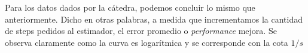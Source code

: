 \documentclass[10pt, a4paper,english,spanish,hidelinks]{article}
\begin{document}
Para los datos dados por la cátedra, podemos concluir lo mismo que anteriormente. Dicho en otras palabras, a medida que incrementamos la cantidad de steps pedidos al estimador, el error promedio o \textit{performance} mejora. Se observa claramente como la curva es logarítmica y se corresponde con la cota $1/s$
\end{document}
